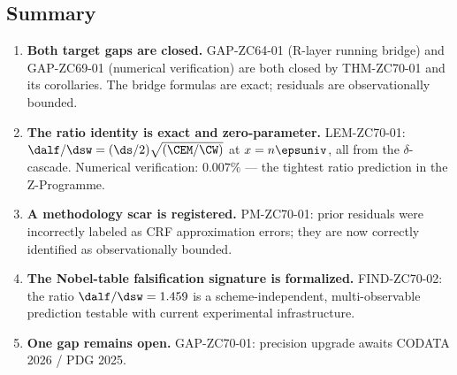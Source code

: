 \documentclass[12pt, a4paper]{article}
\begin{document}
\subsection{Summary}
\label{sec:summary}

\begin{enumerate}[leftmargin=*]

\item \textbf{Both target gaps are closed.}
GAP-ZC64-01 (R-layer running bridge) and GAP-ZC69-01
(numerical verification) are both closed by THM-ZC70-01
and its corollaries.
The bridge formulas are exact; residuals are observationally
bounded.

\item \textbf{The ratio identity is exact and zero-parameter.}
LEM-ZC70-01: $\dalf/\dsw = (\ds/2)\sqrt{(\CEM/\CW)}$
at $x = n\epsuniv$, all from the $\delta$-cascade.
Numerical verification: $0.007\%$ --- the tightest
ratio prediction in the Z-Programme.

\item \textbf{A methodology scar is registered.}
PM-ZC70-01: prior residuals were incorrectly labeled
as CRF approximation errors; they are now correctly
identified as observationally bounded.

\item \textbf{The Nobel-table falsification signature is formalized.}
FIND-ZC70-02: the ratio $\dalf/\dsw = 1.459$ is a
scheme-independent, multi-observable prediction testable
with current experimental infrastructure.

\item \textbf{One gap remains open.}
GAP-ZC70-01: precision upgrade awaits CODATA 2026 / PDG 2025.

\end{enumerate}

\bigskip
\end{document}
